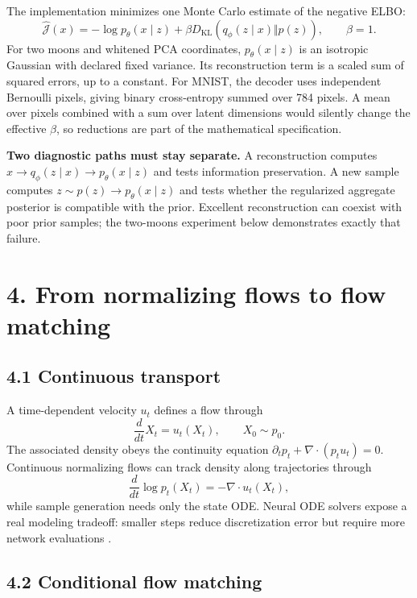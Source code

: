 \documentclass[11pt]{article}
\begin{document}
The implementation minimizes one Monte Carlo estimate of the negative ELBO:
\[
\widehat{\mathcal J}(x)
=-\log p_\theta(x\mid z)
+\beta D_{\mathrm{KL}}(q_\phi(z\mid x)\Vert p(z)),
\qquad \beta=1.
\]
For two moons and whitened PCA coordinates, $p_\theta(x\mid z)$ is an isotropic
Gaussian with declared fixed variance. Its reconstruction term is a scaled sum
of squared errors, up to a constant. For MNIST, the decoder uses independent
Bernoulli pixels, giving binary cross-entropy summed over 784 pixels. A mean over
pixels combined with a sum over latent dimensions would silently change the
effective $\beta$, so reductions are part of the mathematical specification.

\textbf{Two diagnostic paths must stay separate.} A reconstruction computes
$x\to q_\phi(z\mid x)\to p_\theta(x\mid z)$ and tests information preservation.
A new sample computes $z\sim p(z)\to p_\theta(x\mid z)$ and tests whether the
regularized aggregate posterior is compatible with the prior. Excellent
reconstruction can coexist with poor prior samples; the two-moons experiment
below demonstrates exactly that failure.

\section*{4. From normalizing flows to flow matching}

\subsection*{4.1 Continuous transport}

A time-dependent velocity $u_t$ defines a flow through
\[
 \frac{d}{dt}X_t=u_t(X_t),\qquad X_0\sim p_0.
\]
The associated density obeys the continuity equation
$\partial_t p_t+\nabla\!\cdot(p_tu_t)=0$. Continuous normalizing flows can track
density along trajectories through
\[
 \frac{d}{dt}\log p_t(X_t)=-\nabla\!\cdot u_t(X_t),
\]
while sample generation needs only the state ODE. Neural ODE solvers expose a
real modeling tradeoff: smaller steps reduce discretization error but require
more network evaluations \cite{chen2018neural}.

\subsection*{4.2 Conditional flow matching}
\end{document}
